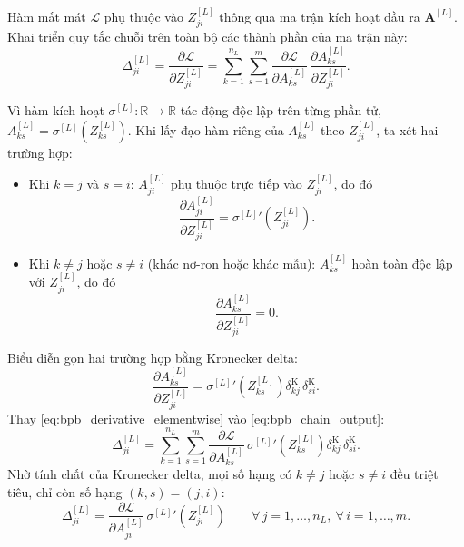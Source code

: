 Hàm mất mát $\mathcal{L}$ phụ thuộc vào $Z_{ji}^{[L]}$ thông qua ma trận kích hoạt đầu ra $\mathbf{A}^{[L]}$. Khai triển quy tắc chuỗi trên toàn bộ các thành phần của ma trận này:
\begin{equation}
\Delta_{ji}^{[L]} = \frac{\partial\mathcal{L}}{\partial Z_{ji}^{[L]}} = \sum_{k=1}^{n_L}\sum_{s=1}^{m} \frac{\partial\mathcal{L}}{\partial A_{ks}^{[L]}}\,\frac{\partial A_{ks}^{[L]}}{\partial Z_{ji}^{[L]}}.
\label{eq:bpb_chain_output}
\end{equation}
 
Vì hàm kích hoạt $\sigma^{[L]}: \mathbb{R} \to \mathbb{R}$ tác động độc lập trên từng phần tử, $A_{ks}^{[L]} = \sigma^{[L]}\!\left(Z_{ks}^{[L]}\right)$. Khi lấy đạo hàm riêng của $A_{ks}^{[L]}$ theo $Z_{ji}^{[L]}$, ta xét hai trường hợp:
\begin{itemize}
    \item Khi $k = j$ và $s = i$: $A_{ji}^{[L]}$ phụ thuộc trực tiếp vào $Z_{ji}^{[L]}$, do đó
    \begin{equation}
    \frac{\partial A_{ji}^{[L]}}{\partial Z_{ji}^{[L]}} = {\sigma^{[L]}}'\!\left(Z_{ji}^{[L]}\right).
    \end{equation}
    \item Khi $k \neq j$ hoặc $s \neq i$ (khác nơ-ron hoặc khác mẫu): $A_{ks}^{[L]}$ hoàn toàn độc lập với $Z_{ji}^{[L]}$, do đó
    \begin{equation}
    \frac{\partial A_{ks}^{[L]}}{\partial Z_{ji}^{[L]}} = 0.
    \end{equation}
\end{itemize}
Biểu diễn gọn hai trường hợp bằng Kronecker delta:
\begin{equation}
\frac{\partial A_{ks}^{[L]}}{\partial Z_{ji}^{[L]}} = {\sigma^{[L]}}'\!\left(Z_{ks}^{[L]}\right)\delta^{\mathrm{K}}_{kj}\,\delta^{\mathrm{K}}_{si}.
\label{eq:bpb_derivative_elementwise}
\end{equation}
Thay \eqref{eq:bpb_derivative_elementwise} vào \eqref{eq:bpb_chain_output}:
\begin{equation}
\Delta_{ji}^{[L]} = \sum_{k=1}^{n_L}\sum_{s=1}^{m} \frac{\partial\mathcal{L}}{\partial A_{ks}^{[L]}}\,{\sigma^{[L]}}'\!\left(Z_{ks}^{[L]}\right)\delta^{\mathrm{K}}_{kj}\,\delta^{\mathrm{K}}_{si}.
\end{equation}
Nhờ tính chất của Kronecker delta, mọi số hạng có $k \neq j$ hoặc $s \neq i$ đều triệt tiêu, chỉ còn số hạng $(k,s) = (j,i)$:
\begin{equation}
\Delta_{ji}^{[L]} = \frac{\partial\mathcal{L}}{\partial A_{ji}^{[L]}}\,{\sigma^{[L]}}'\!\left(Z_{ji}^{[L]}\right)
\qquad \forall\, j = 1,\dots,n_L,\ \forall\, i = 1,\dots,m.
\label{eq:bpb_scalar_output}
\end{equation}
 
